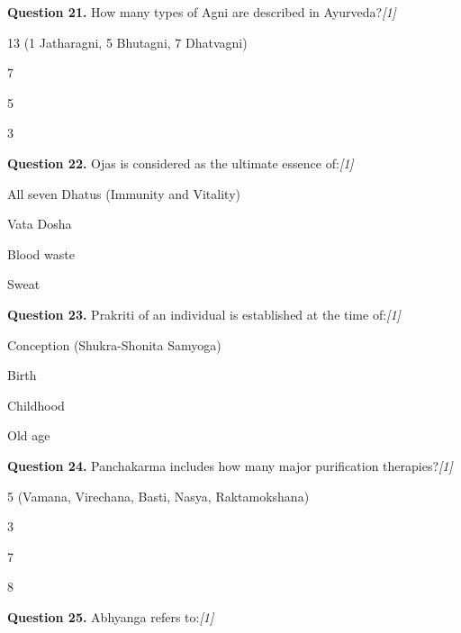 \documentclass[11pt,a4paper]{article}
\newcommand{\pts}[1]{\hfill   \textit{[#1]}}
\begin{document}
\noindent   \textbf{Question 21.} How many types of Agni are described in Ayurveda?\pts{1}

\begin{parts}
  \item 13 (1 Jatharagni, 5 Bhutagni, 7 Dhatvagni)
  \item 7
  \item 5
  \item 3
\end{parts}

\medskip




\noindent   \textbf{Question 22.} Ojas is considered as the ultimate essence of:\pts{1}

\begin{parts}
  \item All seven Dhatus (Immunity and Vitality)
  \item Vata Dosha
  \item Blood waste
  \item Sweat
\end{parts}

\medskip




\noindent   \textbf{Question 23.} Prakriti of an individual is established at the time of:\pts{1}

\begin{parts}
  \item Conception (Shukra-Shonita Samyoga)
  \item Birth
  \item Childhood
  \item Old age
\end{parts}

\medskip




\noindent   \textbf{Question 24.} Panchakarma includes how many major purification therapies?\pts{1}

\begin{parts}
  \item 5 (Vamana, Virechana, Basti, Nasya, Raktamokshana)
  \item 3
  \item 7
  \item 8
\end{parts}

\medskip




\noindent   \textbf{Question 25.} Abhyanga refers to:\pts{1}
\end{document}
